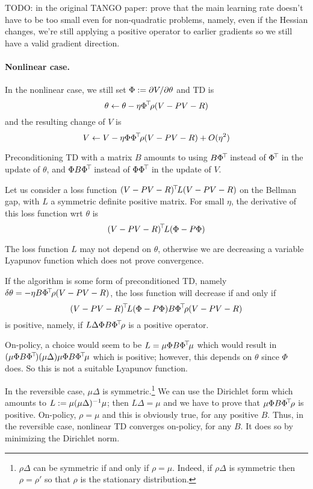 \documentclass[11pt,a4paper]{article}
\begin{document}
TODO: in the original TANGO paper: prove that the main learning rate
doesn't have to be too small even for non-quadratic problems, namely,
even if the Hessian changes, we're still applying a positive operator to
earlier gradients so we still have a valid gradient direction.

\paragraph{Nonlinear case.} In the nonlinear case, we still set $\Phi\mathrel{\mathop{:}}=
\partial V/\partial \theta$ and TD is
\begin{equation}
\theta \gets \theta-\eta \Phi^{\!\top}\!\rho (V-PV-R)
\end{equation}
and the resulting change of $V$ is
\begin{equation}
V\gets V-\eta \Phi\Phi^{\!\top}\!\rho (V-PV-R)+O(\eta^2)
\end{equation}

Preconditioning TD with a matrix $B$ amounts to using $B\Phi^{\!\top}\!$ instead of
$\Phi^{\!\top}\!$ in the update of $\theta$, and $\Phi B \Phi^{\!\top}\!$ instead of
$\Phi\Phi^{\!\top}\!$ in the update of $V$.

Let us consider a loss function $(V-PV-R)^{\!\top}\!L(V-PV-R)$ on the
Bellman gap, with $L$ a symmetric definite positive matrix. For small
$\eta$, the derivative of this loss function wrt $\theta$ is
\begin{equation}
(V-PV-R)^{\!\top}\!L(\Phi-P\Phi)
\end{equation}

The loss function $L$ may not depend on $\theta$, otherwise we are
decreasing a variable Lyapunov function which does not prove convergence.

If the algorithm is some form of preconditioned TD, namely
$\delta\theta=-\eta B\Phi^{\!\top}\!\rho (V-PV-R)$, the loss function will
decrease if and only if
\begin{equation}
(V-PV-R)^{\!\top}\!L(\Phi-P\Phi)B\Phi^{\!\top}\!\rho (V-PV-R)
\end{equation}
is positive, namely, if $L\Delta \Phi B \Phi^{\!\top}\!\rho $ is a positive
operator.

On-policy, a choice would seem to be $L=\mu\Phi B \Phi^{\!\top}\!\mu$ which
would result in $(\mu\Phi B \Phi^{\!\top}\!)(\mu \Delta) \mu\Phi B
\Phi^{\!\top}\!\mu$ which is positive; however, this depends on $\theta$
since $\Phi$ does. So this is not a suitable Lyapunov function.

In the reversible case, $\mu\Delta$ is symmetric.\footnote{$\rho \Delta$
can be symmetric if and only if $\rho=\mu$. Indeed, if $\rho \Delta$ is
symmetric then $\rho=\rho'$ so that $\rho$ is the stationary distribution.} We can use the
Dirichlet form which amounts to $L\mathrel{\mathop{:}}=\mu(\mu\Delta)^{-1}\mu$; then
$L\Delta=\mu$ and we have to prove that $\mu\Phi B\Phi^{\!\top}\!\rho$ is
positive.  On-policy, $\rho=\mu$ and this is obviously true, for any
positive $B$. Thus, in the reversible case, nonlinear TD converges
on-policy, for any $B$. It does so by minimizing the Dirichlet norm.
\end{document}
